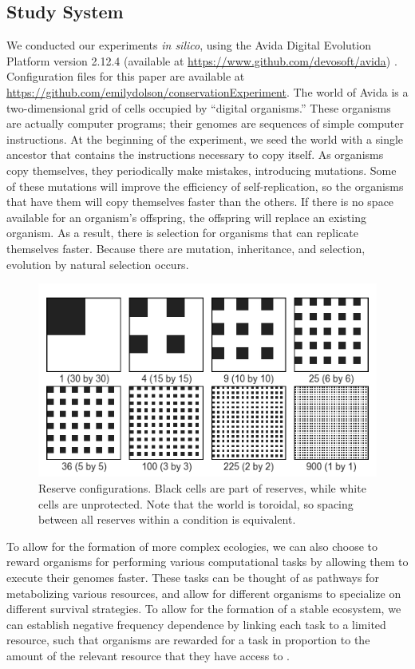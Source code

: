 \documentclass[letterpaper]{article}
\begin{document}
\subsection{Study System}
We conducted our experiments \textit{in silico}, using the Avida Digital Evolution Platform version 2.12.4 (available at \href{url}{https://www.github.com/devosoft/avida}) \citep{ofria_avida:_2004}. Configuration files for this paper are available at \href{url}{https://github.com/emilydolson/conservationExperiment}. The world of Avida is a two-dimensional grid of cells occupied by “digital organisms.” These organisms are actually computer programs; their genomes are sequences of simple computer instructions. At the beginning of the experiment, we seed the world with a single ancestor that contains the instructions necessary to copy itself. As organisms copy themselves, they periodically make mistakes, introducing mutations. Some of these mutations will improve the efficiency of self-replication, so the organisms that have them will copy themselves faster than the others. If there is no space available for an organism's offspring, the offspring will replace an existing organism. As a result, there is selection for organisms that can replicate themselves faster. Because there are mutation, inheritance, and selection, evolution by natural selection occurs. 

\begin{figure}[h]
	\centering
	\includegraphics[]{reserves.png}
    \caption{Reserve configurations. Black cells are part of reserves, while white cells are unprotected. Note that the world is toroidal, so spacing between all reserves within a condition is equivalent.}
    \label{fig:reserveconfigs}
\end{figure}

	To allow for the formation of more complex ecologies, we can also choose to reward organisms for performing various computational tasks by allowing them to execute their genomes faster. These tasks can be thought of as pathways for metabolizing various resources, and allow for different organisms to specialize on different survival strategies. To allow for the formation of a stable ecosystem, we can establish negative frequency dependence by linking each task to a limited resource, such that organisms are rewarded for a task in proportion to the amount of the relevant resource that they have access to \citep{chow_adaptive_2004}.
\end{document}
